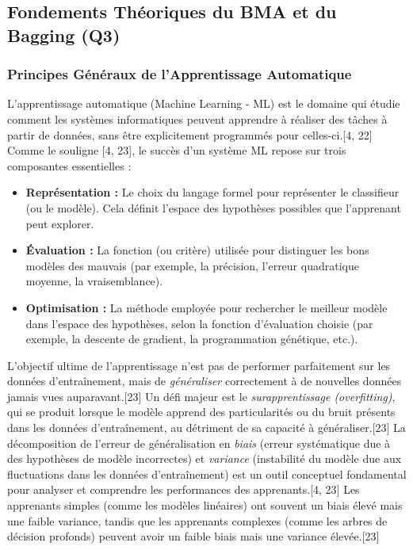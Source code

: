 \documentclass[11pt,a4paper]{article}
\begin{document}
\subsection{Fondements Théoriques du BMA et du Bagging (Q3)}

\subsubsection{Principes Généraux de l'Apprentissage Automatique}
L'apprentissage automatique (Machine Learning - ML) est le domaine qui étudie comment les systèmes informatiques peuvent apprendre à réaliser des tâches à partir de données, sans être explicitement programmés pour celles-ci.[4, 22] Comme le souligne \citet{Domingos2012} [4, 23], le succès d'un système ML repose sur trois composantes essentielles :
\begin{itemize}
    \item \textbf{Représentation :} Le choix du langage formel pour représenter le classifieur (ou le modèle). Cela définit l'espace des hypothèses possibles que l'apprenant peut explorer.
    \item \textbf{Évaluation :} La fonction (ou critère) utilisée pour distinguer les bons modèles des mauvais (par exemple, la précision, l'erreur quadratique moyenne, la vraisemblance).
    \item \textbf{Optimisation :} La méthode employée pour rechercher le meilleur modèle dans l'espace des hypothèses, selon la fonction d'évaluation choisie (par exemple, la descente de gradient, la programmation génétique, etc.).
\end{itemize}
L'objectif ultime de l'apprentissage n'est pas de performer parfaitement sur les données d'entraînement, mais de \textit{généraliser} correctement à de nouvelles données jamais vues auparavant.[23] Un défi majeur est le \textit{surapprentissage (overfitting)}, qui se produit lorsque le modèle apprend des particularités ou du bruit présents dans les données d'entraînement, au détriment de sa capacité à généraliser.[23] La décomposition de l'erreur de généralisation en \textit{biais} (erreur systématique due à des hypothèses de modèle incorrectes) et \textit{variance} (instabilité du modèle due aux fluctuations dans les données d'entraînement) est un outil conceptuel fondamental pour analyser et comprendre les performances des apprenants.[4, 23] Les apprenants simples (comme les modèles linéaires) ont souvent un biais élevé mais une faible variance, tandis que les apprenants complexes (comme les arbres de décision profonds) peuvent avoir un faible biais mais une variance élevée.[23]
\end{document}
